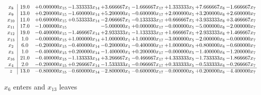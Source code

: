 \documentclass[10pt]{article}
\begin{document}
 \[\begin{array}{c| c c@{\hskip 2pt} c@{\hskip 2pt} c@{\hskip 2pt} c@{\hskip 2pt} c@{\hskip 2pt} c@{\hskip 2pt} c@{\hskip 2pt} }
 x_{8}   &  19.0 & + 0.000000 x_{15} & -1.333333 x_{14} & + 3.666667 x_{1} & -1.666667 x_{17} & + 1.333333 x_{5} & + 7.666667 x_{6} & -1.666667 x_{7}\\
 x_{9}   &  13.0 & + 0.200000 x_{15} & -1.600000 x_{14} & + 5.200000 x_{1} & -0.600000 x_{17} & + 2.000000 x_{5} & + 3.200000 x_{6} & + 2.600000 x_{7}\\
 x_{10}   &  11.0 & + 0.600000 x_{15} & + 0.533333 x_{14} & -2.066667 x_{1} & -0.133333 x_{17} & + 0.666667 x_{5} & + 3.933333 x_{6} & + 3.466667 x_{7}\\
 x_{11}   &  17.0 & -1.000000 x_{15} &   & -5.000000 x_{1} & + 0.000000 x_{17} & -0.000000 x_{5} & -5.000000 x_{6} & -2.000000 x_{7}\\
 x_{12}   &  19.0 & -0.400000 x_{15} & -1.466667 x_{14} & + 2.933333 x_{1} & -1.133333 x_{17} & + 1.666667 x_{5} & + 2.933333 x_{6} & + 1.466667 x_{7}\\
 x_{13}   &  1.0 & -0.000000 x_{15} & + 1.000000 x_{14} & + 1.000000 x_{1} & + 1.000000 x_{17} & -3.000000 x_{5} & -2.000000 x_{6} & -0.000000 x_{7}\\
 x_{2}   &  6.0 & -0.200000 x_{15} & -0.400000 x_{14} & -0.200000 x_{1} & -0.400000 x_{17} & + 1.000000 x_{5} & + 0.800000 x_{6} & -0.600000 x_{7}\\
 x_{3}   &  1.0 & -0.400000 x_{15} & + 0.200000 x_{14} & -1.400000 x_{1} & + 0.200000 x_{17} & -0.000000 x_{5} & -1.400000 x_{6} & -1.200000 x_{7}\\
 x_{16}   &  21.0 & -0.400000 x_{15} & -1.133333 x_{14} & + 3.266667 x_{1} & -0.466667 x_{17} & + 4.333333 x_{5} & -1.733333 x_{6} & -1.866667 x_{7}\\
 x_{4}   &  2.0 & -0.200000 x_{15} & + 0.266667 x_{14} & -1.533333 x_{1} & -0.066667 x_{17} & + 0.333333 x_{5} & -0.533333 x_{6} & -0.266667 x_{7}\\
\hline
z    &  13.0 & -0.800000 x_{15} & -0.600000 x_{14} & -2.800000 x_{1} & -0.600000 x_{17} & -0.000000 x_{5} & + 0.200000 x_{6} & -4.400000 x_{7}\\
\end{array}\]


 $ x_{6} $ enters and $ x_{13} $ leaves 
\end{document}
